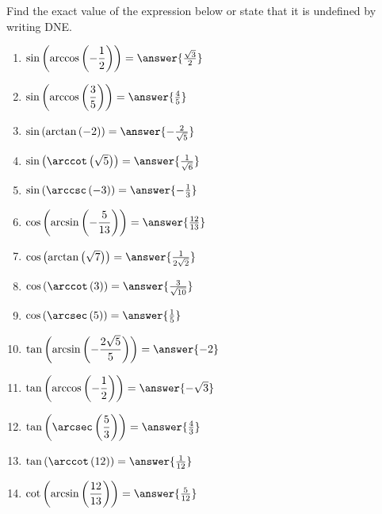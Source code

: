 \documentclass{ximera}
\author{Carl Stitz \and Jeff Zeager \and Bart Snapp \and Matthew Carr}
\begin{document}
\begin{exercise}





Find the exact value of the expression below or state that it is undefined by writing DNE.
\begin{multicols}{2}
\begin{enumerate}
\item  $\sin\left(\arccos\left(-\dfrac{1}{2}\right)\right)=\answer{\frac{\sqrt{3}}{2}}$ \label{stillmoreexactfirst}
\item  $\sin\left(\arccos\left(\dfrac{3}{5}\right)\right)=\answer{\frac{4}{5}}$
\item  $\sin\left(\arctan\left(-2\right)\right)=\answer{-\frac{2}{\sqrt{5}}}$ 
\item  $\sin\left(\arccot\left(\sqrt{5}\right)\right)=\answer{\frac{1}{\sqrt{6}}}$ 
\item  $\sin\left(\arccsc\left(-3\right)\right)=\answer{-\frac{1}{3}}$ 
\item  $\cos\left(\arcsin\left(-\dfrac{5}{13}\right)\right)=\answer{\frac{12}{13}}$
\item  $\cos\left(\arctan\left(\sqrt{7} \right)\right)=\answer{\frac{1}{2\sqrt{2}}}$
\item  $\cos\left(\arccot\left( 3 \right)\right)=\answer{\frac{3}{\sqrt{10}}}$
\item  $\cos\left(\arcsec\left( 5 \right)\right)=\answer{\frac{1}{5}}$
\item  $\tan\left(\arcsin\left(-\dfrac{2\sqrt{5}}{5}\right)\right)=\answer{-2}$
\item  $\tan\left(\arccos\left(-\dfrac{1}{2}\right)\right)=\answer{-\sqrt{3}}$ 
\item  $\tan\left(\arcsec\left(\dfrac{5}{3}\right)\right)=\answer{\frac{4}{3}}$ 
\item  $\tan\left(\arccot\left( 12  \right)\right)=\answer{\frac{1}{12}}$ 
\item  $\cot\left(\arcsin\left(\dfrac{12}{13}\right)\right)=\answer{\frac{5}{12}}$ 

\end{enumerate}
\end{multicols}
\end{exercise}
\end{document}
